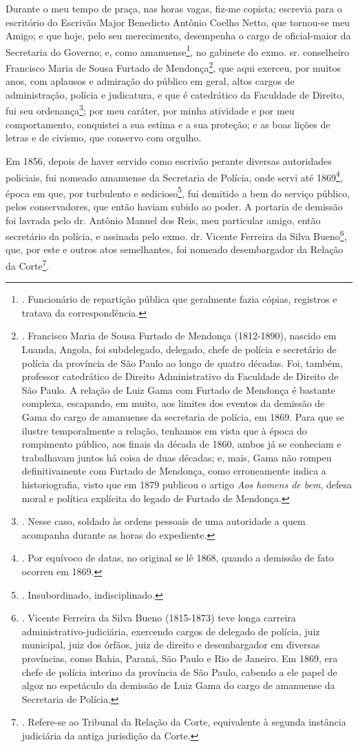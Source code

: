 Durante o meu tempo de praça, nas horas vagas, fiz-me copista; escrevia
para o escritório do Escrivão Major Benedicto Antônio Coelho Netto, que
tornou-se meu Amigo; e que hoje, pelo seu merecimento, desempenha o
cargo de oficial-maior da Secretaria do Governo; e, como
amanuense\footnote{. Funcionário de repartição pública que geralmente
  fazia cópias, registros e tratava da correspondência.}, no gabinete do
exmo. sr. conselheiro Francisco Maria de Sousa Furtado de
Mendonça\footnote{. Francisco Maria de Sousa Furtado de Mendonça
  (1812-1890), nascido em Luanda, Angola, foi subdelegado, delegado,
  chefe de polícia e secretário de polícia da província de São Paulo ao
  longo de quatro décadas. Foi, também, professor catedrático de Direito
  Administrativo da Faculdade de Direito de São Paulo. A relação de Luiz
  Gama com Furtado de Mendonça é bastante complexa, escapando, em muito,
  aos limites dos eventos da demissão de Gama do cargo de amanuense da
  secretaria de polícia, em 1869. Para que se ilustre temporalmente a
  relação, tenhamos em vista que à época do rompimento público, aos
  finais da década de 1860, ambos já se conheciam e trabalhavam juntos
  há coisa de duas décadas; e, mais, Gama não rompeu definitivamente com
  Furtado de Mendonça, como erroneamente indica a historiografia, visto
  que em 1879 publicou o artigo \emph{Aos homens de bem}, defesa moral e
  política explícita do legado de Furtado de Mendonça.}, que aqui
exerceu, por muitos anos, com aplausos e admiração do público em geral,
altos cargos de administração, polícia e judicatura, e que é catedrático
da Faculdade de Direito, fui seu ordenança\footnote{. Nesse caso,
  soldado às ordens pessoais de uma autoridade a quem acompanha durante
  as horas do expediente.}; por meu caráter, por minha atividade e por
meu comportamento, conquistei a sua estima e a sua proteção; e as boas
lições de letras e de civismo, que conservo com orgulho.

Em 1856, depois de haver servido como escrivão perante diversas
autoridades policiais, fui nomeado amanuense da Secretaria de Polícia,
onde servi até 1869\footnote{. Por equívoco de datas, no original se lê
  1868, quando a demissão de fato ocorreu em 1869.}, época em que, por
{turbulento} e {sedicioso}\footnote{. Insubordinado, indisciplinado.}{,}
fui demitido {a bem do serviço público}, pelos conservadores, que então
haviam subido ao poder. A portaria de demissão foi lavrada pelo dr.
Antônio Manuel dos Reis, meu particular amigo, então secretário da
polícia, e assinada pelo exmo. dr. Vicente Ferreira da Silva
Bueno\footnote{. Vicente Ferreira da Silva Bueno (1815-1873) teve longa
  carreira administrativo-judiciária, exercendo cargos de delegado de
  polícia, juiz municipal, juiz dos órfãos, juiz de direito e
  desembargador em diversas províncias, como Bahia, Paraná, São Paulo e
  Rio de Janeiro. Em 1869, era chefe de polícia interino da província de
  São Paulo, cabendo a ele papel de algoz no espetáculo da demissão de
  Luiz Gama do cargo de amanuense da Secretaria de Polícia.}, que, por
este e outros atos semelhantes, foi nomeado desembargador da Relação da
Corte\footnote{. Refere-se ao Tribunal da Relação da Corte, equivalente
  à segunda instância judiciária da antiga jurisdição da Corte.}.

